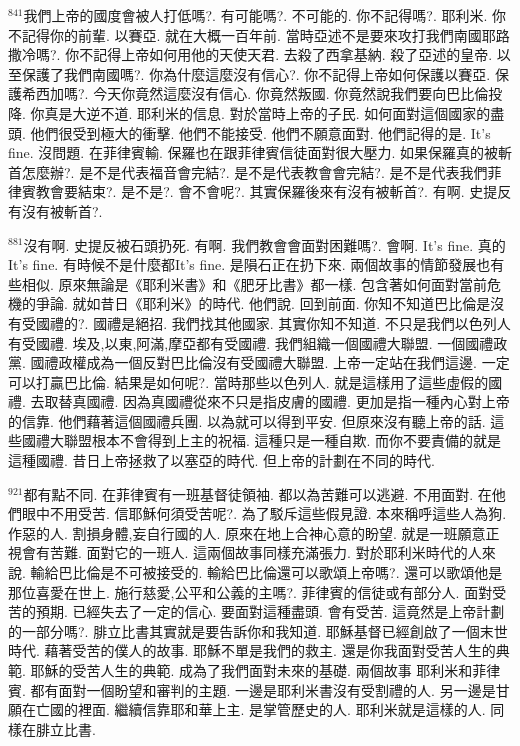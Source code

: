 \documentclass{book}
\begin{document}
$^{841}$我們上帝的國度會被人打低嗎?.
有可能嗎?.
不可能的.
你不記得嗎?.
耶利米.
你不記得你的前輩.
以賽亞.
就在大概一百年前.
當時亞述不是要來攻打我們南國耶路撒冷嗎?.
你不記得上帝如何用他的天使天君.
去殺了西拿基納.
殺了亞述的皇帝.
以至保護了我們南國嗎?.
你為什麼這麼沒有信心?.
你不記得上帝如何保護以賽亞.
保護希西加嗎?.
今天你竟然這麼沒有信心.
你竟然叛國.
你竟然說我們要向巴比倫投降.
你真是大逆不道.
耶利米的信息.
對於當時上帝的子民.
如何面對這個國家的盡頭.
他們很受到極大的衝擊.
他們不能接受.
他們不願意面對.
他們記得的是.
It's fine.
沒問題.
在菲律賓輸.
保羅也在跟菲律賓信徒面對很大壓力.
如果保羅真的被斬首怎麼辦?.
是不是代表福音會完結?.
是不是代表教會會完結?.
是不是代表我們菲律賓教會要結束?.
是不是?.
會不會呢?.
其實保羅後來有沒有被斬首?.
有啊.
史提反有沒有被斬首?.

$^{881}$沒有啊.
史提反被石頭扔死.
有啊.
我們教會會面對困難嗎?.
會啊.
It's fine.
真的It's fine.
有時候不是什麼都It's fine.
是隕石正在扔下來.
兩個故事的情節發展也有些相似.
原來無論是《耶利米書》和《肥牙比書》都一樣.
包含著如何面對當前危機的爭論.
就如昔日《耶利米》的時代.
他們說.
回到前面.
你知不知道巴比倫是沒有受國禮的?.
國禮是絕招.
我們找其他國家.
其實你知不知道.
不只是我們以色列人有受國禮.
埃及,以東,阿滿,摩亞都有受國禮.
我們組織一個國禮大聯盟.
一個國禮政黨.
國禮政權成為一個反對巴比倫沒有受國禮大聯盟.
上帝一定站在我們這邊.
一定可以打贏巴比倫.
結果是如何呢?.
當時那些以色列人.
就是這樣用了這些虛假的國禮.
去取替真國禮.
因為真國禮從來不只是指皮膚的國禮.
更加是指一種內心對上帝的信靠.
他們藉著這個國禮兵團.
以為就可以得到平安.
但原來沒有聽上帝的話.
這些國禮大聯盟根本不會得到上主的祝福.
這種只是一種自欺.
而你不要責備的就是這種國禮.
昔日上帝拯救了以塞亞的時代.
但上帝的計劃在不同的時代.

$^{921}$都有點不同.
在菲律賓有一班基督徒領袖.
都以為苦難可以逃避.
不用面對.
在他們眼中不用受苦.
信耶穌何須受苦呢?.
為了駁斥這些假見證.
本來稱呼這些人為狗.
作惡的人.
割損身體,妄自行國的人.
原來在地上合神心意的盼望.
就是一班願意正視會有苦難.
面對它的一班人.
這兩個故事同樣充滿張力.
對於耶利米時代的人來說.
輸給巴比倫是不可被接受的.
輸給巴比倫還可以歌頌上帝嗎?.
還可以歌頌他是那位喜愛在世上.
施行慈愛,公平和公義的主嗎?.
菲律賓的信徒或有部分人.
面對受苦的預期.
已經失去了一定的信心.
要面對這種盡頭.
會有受苦.
這竟然是上帝計劃的一部分嗎?.
腓立比書其實就是要告訴你和我知道.
耶穌基督已經創啟了一個末世時代.
藉著受苦的僕人的故事.
耶穌不單是我們的救主.
還是你我面對受苦人生的典範.
耶穌的受苦人生的典範.
成為了我們面對未來的基礎.
兩個故事 耶利米和菲律賓.
都有面對一個盼望和審判的主題.
一邊是耶利米書沒有受割禮的人.
另一邊是甘願在亡國的裡面.
繼續信靠耶和華上主.
是掌管歷史的人.
耶利米就是這樣的人.
同樣在腓立比書.
\end{document}

